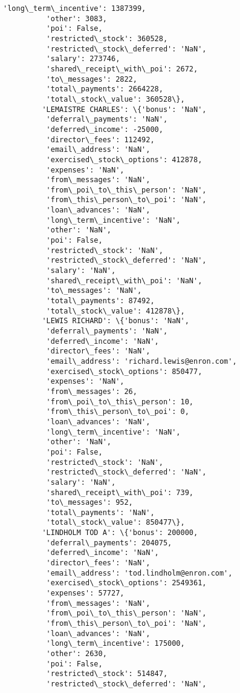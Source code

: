 \documentclass[11pt]{article}
\begin{document}
\begin{Verbatim}[commandchars=\\\{\}]
          'long\_term\_incentive': 1387399,
          'other': 3083,
          'poi': False,
          'restricted\_stock': 360528,
          'restricted\_stock\_deferred': 'NaN',
          'salary': 273746,
          'shared\_receipt\_with\_poi': 2672,
          'to\_messages': 2822,
          'total\_payments': 2664228,
          'total\_stock\_value': 360528\},
         'LEMAISTRE CHARLES': \{'bonus': 'NaN',
          'deferral\_payments': 'NaN',
          'deferred\_income': -25000,
          'director\_fees': 112492,
          'email\_address': 'NaN',
          'exercised\_stock\_options': 412878,
          'expenses': 'NaN',
          'from\_messages': 'NaN',
          'from\_poi\_to\_this\_person': 'NaN',
          'from\_this\_person\_to\_poi': 'NaN',
          'loan\_advances': 'NaN',
          'long\_term\_incentive': 'NaN',
          'other': 'NaN',
          'poi': False,
          'restricted\_stock': 'NaN',
          'restricted\_stock\_deferred': 'NaN',
          'salary': 'NaN',
          'shared\_receipt\_with\_poi': 'NaN',
          'to\_messages': 'NaN',
          'total\_payments': 87492,
          'total\_stock\_value': 412878\},
         'LEWIS RICHARD': \{'bonus': 'NaN',
          'deferral\_payments': 'NaN',
          'deferred\_income': 'NaN',
          'director\_fees': 'NaN',
          'email\_address': 'richard.lewis@enron.com',
          'exercised\_stock\_options': 850477,
          'expenses': 'NaN',
          'from\_messages': 26,
          'from\_poi\_to\_this\_person': 10,
          'from\_this\_person\_to\_poi': 0,
          'loan\_advances': 'NaN',
          'long\_term\_incentive': 'NaN',
          'other': 'NaN',
          'poi': False,
          'restricted\_stock': 'NaN',
          'restricted\_stock\_deferred': 'NaN',
          'salary': 'NaN',
          'shared\_receipt\_with\_poi': 739,
          'to\_messages': 952,
          'total\_payments': 'NaN',
          'total\_stock\_value': 850477\},
         'LINDHOLM TOD A': \{'bonus': 200000,
          'deferral\_payments': 204075,
          'deferred\_income': 'NaN',
          'director\_fees': 'NaN',
          'email\_address': 'tod.lindholm@enron.com',
          'exercised\_stock\_options': 2549361,
          'expenses': 57727,
          'from\_messages': 'NaN',
          'from\_poi\_to\_this\_person': 'NaN',
          'from\_this\_person\_to\_poi': 'NaN',
          'loan\_advances': 'NaN',
          'long\_term\_incentive': 175000,
          'other': 2630,
          'poi': False,
          'restricted\_stock': 514847,
          'restricted\_stock\_deferred': 'NaN',

\end{Verbatim}
\end{document}
